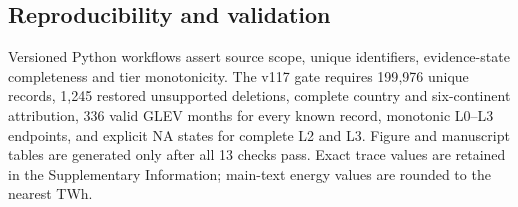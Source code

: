 \subsection{Reproducibility and validation}

Versioned Python workflows assert source scope, unique identifiers, evidence-state completeness and tier monotonicity. The v117 gate requires 199{,}976 unique records, 1{,}245 restored unsupported deletions, complete country and six-continent attribution, 336 valid GLEV months for every known record, monotonic L0--L3 endpoints, and explicit NA states for complete L2 and L3. Figure and manuscript tables are generated only after all 13 checks pass. Exact trace values are retained in the Supplementary Information; main-text energy values are rounded to the nearest TWh.
